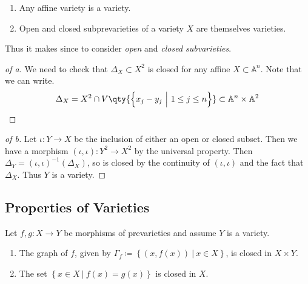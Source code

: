 \begin{lemma}

\envlist

\begin{enumerate}
\def\labelenumi{\alph{enumi}.}
\item
  Any affine variety is a variety.
\item
  Open and closed subprevarieties of a variety \(X\) are themselves
  varieties.
\end{enumerate}

Thus it makes since to consider \emph{open} and \emph{closed
subvarieties}.

\end{lemma}

\begin{proof}[of a]

We need to check that \(\Delta_X \subset X^2\) is closed for any affine
\(X\subset {\mathbb{A}}^n\). Note that we can write.
\begin{align*}
\Delta_X = X^2 \cap V\qty{ \left\{{x_j - y_j {~\mathrel{\Big|}~}1\leq j \leq n}\right\}} \subset {\mathbb{A}}^n \times{\mathbb{A}}^2
\end{align*}

\end{proof}

\begin{proof}[of b]

Let \(\iota:Y\to X\) be the inclusion of either an open or closed
subset. Then we have a morphism \((\iota, \iota): Y^2 \to X^2\) by the
universal property. Then \(\Delta_Y = (\iota, \iota)^{-1} (\Delta_X)\),
so is closed by the continuity of \((\iota, \iota)\) and the fact that
\(\Delta_X\). Thus \(Y\) is a variety.

\end{proof}

\hypertarget{properties-of-varieties}{%
\subsection{Properties of Varieties}\label{properties-of-varieties}}

\begin{proposition}

Let \(f, g: X\to Y\) be morphisms of prevarieties and assume \(Y\) is a
variety.

\begin{enumerate}
\def\labelenumi{\alph{enumi}.}
\item
  The graph of \(f\), given by
  \(\Gamma_f \coloneqq\left\{{(x, f(x)) {~\mathrel{\Big|}~}x\in X}\right\}\),
  is closed in \(X\times Y\).
\item
  The set \(\left\{{x\in X{~\mathrel{\Big|}~}f(x) = g(x)}\right\}\) is
  closed in \(X\).
\end{enumerate}

\end{proposition}


